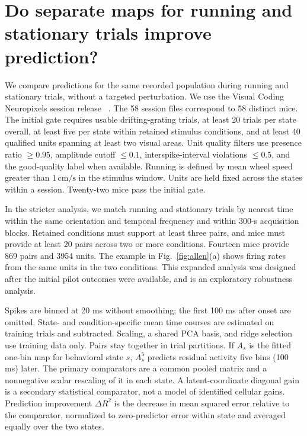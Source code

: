 \documentclass[aps,10pt,onecolumn,superscriptaddress,nofootinbib,
  longbibliography,amsmath,amssymb,floatfix]{revtex4-2}
\begin{document}
\section{Do separate maps for running and stationary trials improve prediction?}
\label{sec:allen}

We compare predictions for the same recorded population during
running and stationary trials, without a targeted perturbation.
We use the Visual Coding Neuropixels session release
~\cite{siegle2021visual}. The 58 session files correspond to 58 distinct
mice. The initial gate requires usable drifting-grating trials, at least
20 trials per state overall, at least five per state within retained
stimulus conditions, and at least 40 qualified units spanning at least
two visual areas. Unit quality filters use presence ratio
\(\ge0.95\), amplitude cutoff \(\le0.1\), interspike-interval
violations \(\le0.5\), and the good-quality label when available.
Running is defined by mean wheel speed greater than \(1\,\mathrm{cm/s}\)
in the stimulus window. Units are held fixed across the states within
a session. Twenty-two mice pass the initial gate.

In the stricter analysis, we match running and stationary trials by
nearest time within the same orientation and temporal frequency and
within 300-s acquisition blocks. Retained conditions must support at
least three pairs, and mice must provide at least 20 pairs across two
or more conditions. Fourteen mice provide 869 pairs and 3954 units.
The example in Fig.~\ref{fig:allen}(a) shows firing rates from
the same units in the two conditions.
This expanded analysis was designed after the initial pilot outcomes
were available, and is an exploratory robustness analysis.

Spikes are binned at 20 ms without smoothing; the first 100 ms after
onset are omitted. State- and condition-specific mean time courses are
estimated on training trials and subtracted. Scaling, a shared PCA
basis, and ridge selection use training data only. Pairs stay together
in trial partitions. If \(A_s\) is the fitted one-bin map for
behavioral state \(s\), \(A_s^5\) predicts residual activity
five bins (100 ms) later. The primary comparators are a
common pooled matrix and a nonnegative scalar rescaling of it in
each state. A latent-coordinate diagonal gain is a secondary
statistical comparator, not a model of identified cellular gains.
Prediction improvement \(\Delta R^2\) is the decrease in mean squared
error relative to the comparator, normalized to zero-predictor error
within state and averaged equally over the two states.
\end{document}
